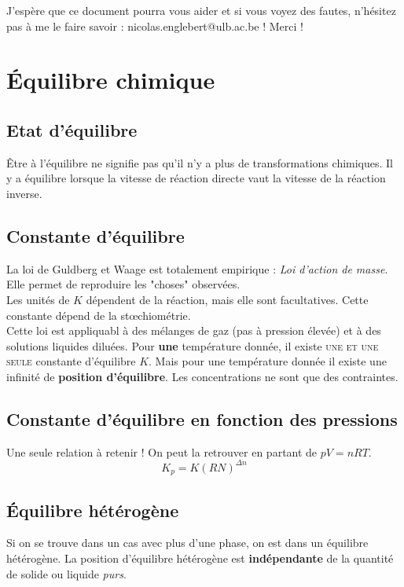 \documentclass[12pt, a4paper]{article}
\begin{document}
J'espère que ce document pourra vous aider et si vous voyez des fautes, n'hésitez pas à me le faire savoir : nicolas.englebert@ulb.ac.be ! Merci !

\newpage
\section{Équilibre chimique}
\subsection{Etat d'équilibre}
Être à l'équilibre ne signifie pas qu'il n'y a plus de transformations chimiques. Il y a équilibre lorsque la vitesse de réaction directe vaut la vitesse de la réaction inverse.

\subsection{Constante d'équilibre}
La loi de Guldberg et Waage est totalement empirique : \textit{Loi d'action de masse}. Elle permet de reproduire les "choses" observées.\\
Les unités de $K$ dépendent de la réaction, mais elle sont facultatives. Cette constante dépend de la stœchiométrie.\\

Cette loi est appliquabl à des mélanges de gaz (pas à pression élevée) et à des solutions liquides diluées. Pour \textbf{une} température donnée, il existe \textsc{une et une seule} constante d'équilibre $K$. Mais pour une température donnée il existe une infinité de \textbf{position d'équilibre}. Les concentrations ne sont que des contraintes.

\subsection{Constante d'équilibre en fonction des pressions}
Une seule relation à retenir ! On peut la retrouver en partant de $pV = nRT$.
$$K_p = K(RN)^{\Delta n}$$

\subsection{Équilibre hétérogène}
Si on se trouve dans un cas avec plus d'une phase, on est dans un équilibre hétérogène. La position d'équilibre hétérogène est \textbf{indépendante} de la quantité de solide ou liquide \textit{purs}.
\end{document}
